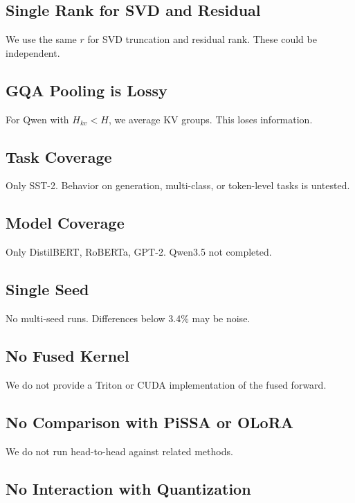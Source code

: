 \subsection{Single Rank for SVD and Residual}

We use the same $r$ for SVD truncation and residual rank. These could be 
independent.

\subsection{GQA Pooling is Lossy}

For Qwen with $H_{kv} < H$, we average KV groups. This loses information.

\subsection{Task Coverage}

Only SST-2. Behavior on generation, multi-class, or token-level tasks is 
untested.

\subsection{Model Coverage}

Only DistilBERT, RoBERTa, GPT-2. Qwen3.5 not completed.

\subsection{Single Seed}

No multi-seed runs. Differences below 3.4\% may be noise.

\subsection{No Fused Kernel}

We do not provide a Triton or CUDA implementation of the fused forward.

\subsection{No Comparison with PiSSA or OLoRA}

We do not run head-to-head against related methods.

\subsection{No Interaction with Quantization}

